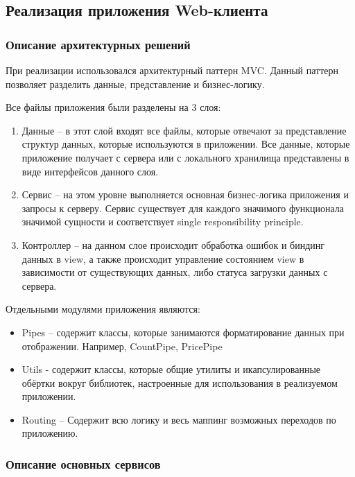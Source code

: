 \subsection{Реализация приложения Web-клиента}\label{subsec:3-impl-web}\indent

\subsubsection{Описание архитектурных решений}\indent

При реализации использовался архитектурный паттерн MVC. Данный паттерн позволяет разделить данные, представление и бизнес-логику.

Все файлы приложения были разделены на 3 слоя:
\begin{enumerate}
    \item Данные – в этот слой входят все файлы, которые отвечают за представление структур данных, которые используются в приложении.
    Все данные, которые приложение получает с сервера или с локального хранилища представлены в виде интерфейсов данного слоя.
    \item Сервис – на этом уровне выполняется основная бизнес-логика приложения и запросы к серверу.
    Сервис существует для каждого значимого функционала значимой сущности и соответствует single responsibility principle.
    \item Контроллер – на данном слое происходит обработка ошибок и биндинг данных в view, а также происходит управление состоянием view в зависимости от существующих данных, либо статуса загрузки данных с сервера.
\end{enumerate}

Отдельными модулями приложения являются:
\begin{itemize}
    \item Pipes – содержит классы, которые занимаются форматирование данных при отображении.
    Например, CountPipe, PricePipe
    \item Utils - содержит классы, которые общие утилиты и икапсулированные обёртки вокруг библиотек, настроенные для использования в реализуемом приложении.
    \item Routing – Содержит всю логику и весь маппинг возможных переходов по приложению.
\end{itemize}

\subsubsection{Описание основных сервисов}\indent

